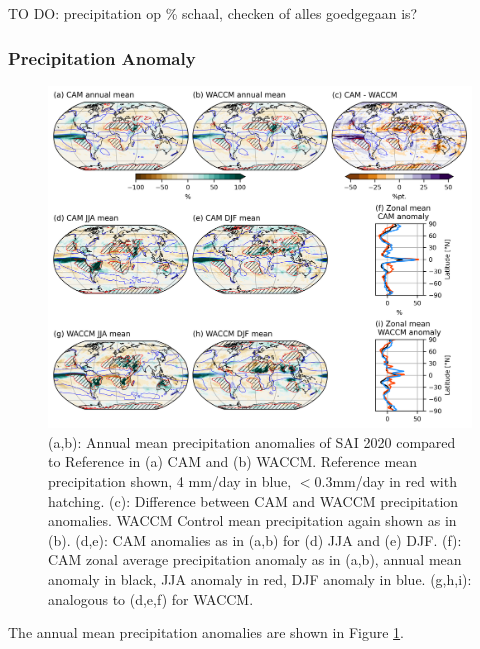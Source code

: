 TO DO: precipitation op \% schaal, checken of alles goedgegaan is?

\subsubsection{Precipitation Anomaly}

\begin{figure}[H]
	\centering
	\includegraphics[width=\linewidth]{../Paper_imgs/PRECT_20ref.png}
	\caption{(a,b): Annual mean precipitation anomalies of SAI 2020 compared to Reference in (a) CAM and (b) WACCM. Reference mean precipitation shown, 4 mm/day in blue, $<0.3$mm/day in red with hatching. (c): Difference between CAM and WACCM precipitation anomalies. WACCM Control mean precipitation again shown as in (b). (d,e): CAM anomalies as in (a,b) for (d) JJA and (e) DJF. (f): CAM zonal average precipitation anomaly as in (a,b), annual mean anomaly in black, JJA anomaly in red, DJF anomaly in blue. (g,h,i): analogous to (d,e,f) for WACCM.}
	\label{fig:PRECT}
\end{figure}

The annual mean precipitation anomalies are shown in Figure \ref{fig:PRECT}.


